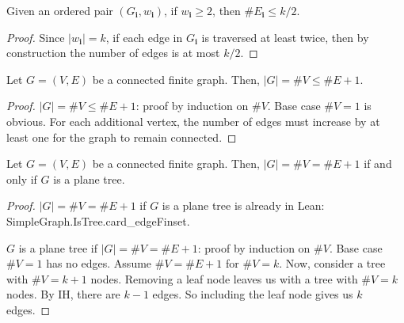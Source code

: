 \begin{lemma}
  \label{lem:edge_set_order_leq_k_over_two}
  Given an ordered pair $(G_\mathbf{i},w_\mathbf{i})$, if $w_\mathbf{i} \geq 2$, then $\# E_\mathbf{i} \leq k/2$.
\end{lemma}
\begin{proof}
  Since $|w_\mathbf{i}| = k$, if each edge in $G_\mathbf{i}$ is traversed at least twice, then by construction the number of edges is at most $k/2$.
\end{proof}








\begin{proposition}%
  \label{prop:vertex_edge_inequality}
  \notready
  Let $G=(V,E)$ be a connected finite graph. Then, $|G|=\#V\le \#E+1$.
\end{proposition}

\begin{proof}
  \notready
  $|G|= \#V\le \#E+1$: proof by induction on $\#V$. Base case $\#V = 1$ is obvious. For each additional vertex, the number of edges must increase by at least one for the graph to remain connected.
\end{proof}

\begin{proposition}
  \label{prop:vertex_edge_tree_equality}
  \notready
  Let $G=(V,E)$ be a connected finite graph. Then, $|G|=\#V=\#E+1$ if and only if $G$ is a plane tree.
\end{proposition}

\begin{proof}
  \notready
  $|G|=\#V=\#E+1$ if $G$ is a plane tree is already in Lean: SimpleGraph.IsTree.card\_edgeFinset.

  $G$ is a plane tree if $|G|=\#V=\#E+1$: proof by induction on $\#V$. Base case $\#V = 1$ has no edges. Assume $\#V = \#E + 1$ for $\#V = k$. Now, consider a tree with $\#V = k+1$ nodes. Removing a leaf node leaves us with a tree with $\#V = k$ nodes. By IH, there are $k - 1$ edges. So including the leaf node gives us $k$ edges.
\end{proof}


